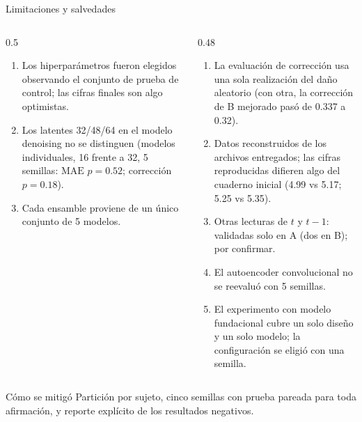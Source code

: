 \documentclass[aspectratio=169,10pt,t]{beamer}
\newcommand{\mae}{\ensuremath{\mathrm{MAE}}}
\begin{document}
\begin{frame}{Limitaciones y salvedades}
\begin{columns}[T]
\begin{column}{0.5\textwidth}
\begin{enumerate}\setlength{\itemsep}{3pt}\footnotesize
\item Los hiperparámetros fueron elegidos observando el conjunto de prueba de control; las cifras finales son algo \alert{optimistas}.
\item Los latentes 32/48/64 en el modelo denoising \alert{no se distinguen} (modelos individuales, 16 frente a 32, 5 semillas: \mae{} $p=0.52$; corrección $p=0.18$).
\item Cada ensamble proviene de un único conjunto de 5 modelos.
\end{enumerate}
\end{column}
\begin{column}{0.48\textwidth}
\begin{enumerate}\setlength{\itemsep}{3pt}\footnotesize\setcounter{enumi}{3}
\item La evaluación de corrección usa una sola realización del daño aleatorio (con otra, la corrección de B mejorado pasó de 0.337 a 0.32).
\item Datos reconstruidos de los archivos entregados; las cifras reproducidas difieren algo del cuaderno inicial (4.99 vs 5.17; 5.25 vs 5.35).
\item Otras lecturas de $t$ y $t-1$: validadas solo en A (dos en B); por confirmar.
\item El autoencoder convolucional no se reevaluó con 5 semillas.
\item El experimento con modelo fundacional cubre un solo diseño y un solo modelo; la configuración se eligió con una semilla.
\end{enumerate}
\end{column}
\end{columns}
\vspace{-4pt}
\begin{exampleblock}{Cómo se mitigó}\footnotesize
Partición por sujeto, cinco semillas con prueba pareada para toda afirmación, y reporte explícito de los resultados negativos.
\end{exampleblock}
\end{frame}
\end{document}
